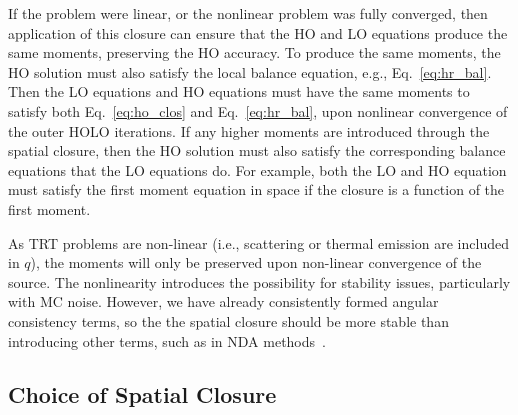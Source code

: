 If the problem were linear, or the nonlinear problem was fully converged,
then application of this closure can ensure that the HO and LO equations produce the same
moments, preserving the HO accuracy.  To produce the
same moments, the HO solution must also satisfy the local balance equation, e.g.,
Eq.~\eqref{eq:hr_bal}.  Then the LO equations and HO equations must have the same moments
to satisfy both Eq.~\eqref{eq:ho_clos} and Eq.~\eqref{eq:hr_bal}, upon nonlinear
convergence of the outer HOLO iterations. If any higher moments are introduced through the spatial closure,
then the HO solution must also satisfy the corresponding balance equations that the LO
equations do.  For example, both the LO and HO equation must satisfy the
first moment equation in space if the closure is a function of the first moment.  

As TRT problems are non-linear (i.e., scattering or thermal emission are included in
$q$), the moments will only be preserved upon non-linear convergence of the source.  The
nonlinearity introduces the possibility for stability
issues, particularly with MC noise.  However, we have already consistently formed angular consistency terms, so the
the spatial closure should be more stable than introducing other terms, such as
in NDA methods~\cite{rmc,willert}. 





\subsection{Choice of Spatial Closure}
\label{sec:spat_clos_options}

